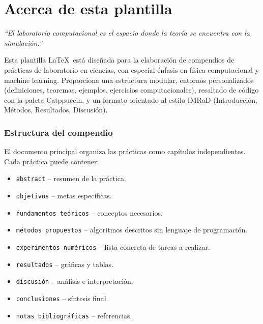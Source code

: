 \chapter*{Acerca de esta plantilla}

\begin{flushright}
\itshape
``El laboratorio computacional es el espacio donde la teoría se encuentra con la simulación.''
\end{flushright}
\bigskip

Esta plantilla \LaTeX\ está diseñada para la elaboración de compendios de prácticas de laboratorio en ciencias, con especial énfasis en física computacional y machine learning. Proporciona una estructura modular, entornos personalizados (definiciones, teoremas, ejemplos, ejercicios computacionales), resaltado de código con la paleta Catppuccin, y un formato orientado al estilo IMRaD (Introducción, Métodos, Resultados, Discusión).

\subsection*{Estructura del compendio}
El documento principal organiza las prácticas como capítulos independientes. Cada práctica puede contener:
\begin{itemize}
  \item \texttt{abstract} – resumen de la práctica.
  \item \texttt{objetivos} – metas específicas.
  \item \texttt{fundamentos teóricos} – conceptos necesarios.
  \item \texttt{métodos propuestos} – algoritmos descritos sin lenguaje de programación.
  \item \texttt{experimentos numéricos} – lista concreta de tareas a realizar.
  \item \texttt{resultados} – gráficas y tablas.
  \item \texttt{discusión} – análisis e interpretación.
  \item \texttt{conclusiones} – síntesis final.
  \item \texttt{notas bibliográficas} – referencias.
\end{itemize}

